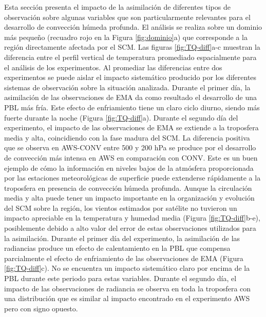 \documentclass[12pt,oneside,a4paper]{reedthesis}
\begin{document}
Esta sección presenta el impacto de la asimilación de diferentes tipos de observación sobre algunas variables que son particularmente relevantes para el desarrollo de convección húmeda profunda. El análisis se realiza sobre un dominio más pequeño (recuadro rojo en la Figura \ref{fig:dominio}a) que corresponde a la región directamente afectada por el SCM. Las figuras \ref{fig:TQ-diff}a-c muestran la diferencia entre el perfil vertical de temperatura promediado espacialmente para el análisis de los experimentos. Al promediar las diferencias entre dos experimentos se puede aislar el impacto sistemático producido por los diferentes sistemas de observación sobre la situación analizada. Durante el primer día, la asimilación de las observaciones de EMA da como resultado el desarrollo de una PBL más fría. Este efecto de enfriamiento tiene un claro ciclo diurno, siendo más fuerte durante la noche (Figura \ref{fig:TQ-diff}a). Durante el segundo día del experimento, el impacto de las observaciones de EMA se extiende a la troposfera media y alta, coincidiendo con la fase madura del SCM. La diferencia positiva que se observa en AWS-CONV entre 500 y 200 hPa se produce por el desarrollo de convección más intensa en AWS en comparación con CONV. Este es un buen ejemplo de cómo la información en niveles bajos de la atmósfera proporcionada por las estaciones meteorológicas de superficie puede extenderse rápidamente a la troposfera en presencia de convección húmeda profunda. Aunque la circulación media y alta puede tener un impacto importante en la organización y evolución del SCM sobre la región, los vientos estimados por satélite no tuvieron un impacto apreciable en la temperatura y humedad media (Figura \ref{fig:TQ-diff}b-e), posiblemente debido a alto valor del error de estas observaciones utilizados para la asimilación.
Durante el primer día del experimento, la asimilación de las radiancias produce un efecto de calentamiento en la PBL que compensa parcialmente el efecto de enfriamiento de las observaciones de EMA (Figura \ref{fig:TQ-diff}c). No se encuentra un impacto sistemático claro por encima de la PBL durante este periodo para estas variables. Durante el segundo día, el impacto de las observaciones de radiancia se observa en toda la troposfera con una distribución que es similar al impacto encontrado en el experimento AWS pero con signo opuesto.
\end{document}
